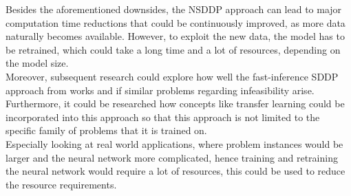 Besides the aforementioned downsides, the NSDDP approach can lead to major computation time reductions that could be continuously improved, as more data naturally becomes available.
However, to exploit the new data, the model has to be retrained, which could take a long time and a lot of resources, depending on the model size. \\
Moreover, subsequent research could explore how well the fast-inference SDDP approach from \cite{NSDDP} works and if similar problems regarding infeasibility arise. \\
Furthermore, it could be researched how concepts like transfer learning could be incorporated into this approach so that this approach is not limited to the specific family of problems that it is trained on. \\
Especially looking at real world applications, where problem instances would be larger and the neural network more complicated, hence training and retraining the neural network would require a lot of resources, this could be used to reduce the resource requirements.

